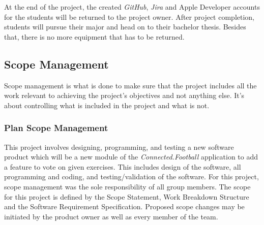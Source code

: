 At the end of the project, the created \textit{GitHub}, \textit{Jira} and Apple Developer accounts for the students will be returned to the project owner. \newline
After project completion, students will pursue their major and head on to their bachelor thesis.\newline
Besides that, there is no more equipment that has to be returned.



\subsection{Scope Management}
\label{ssec:scope_management}

Scope management is what is done to make sure that the project includes all the work relevant to achieving the project’s objectives and not anything else. It’s about controlling what is included in the project and what is not.

\subsubsection{Plan Scope Management}
\label{sssec:plan_scope_management}

This project involves designing, programming, and testing a new software product which will be a new module of the \textit{Connected.Football} application to add a feature to vote on given exercises. This includes design of the software, all programming and coding, and testing/validation of the software.
\newline
For this project, scope management was the sole responsibility of all group members. The scope for this project is defined by the Scope Statement, Work Breakdown Structure and the Software Requirement Specification. Proposed scope changes may be initiated by the product owner as well as every member of the team.


